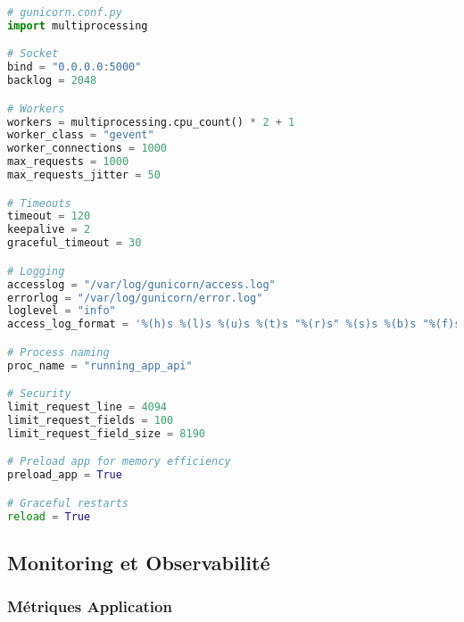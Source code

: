 \begin{lstlisting}[language=python]
# gunicorn.conf.py
import multiprocessing

# Socket
bind = "0.0.0.0:5000"
backlog = 2048

# Workers
workers = multiprocessing.cpu_count() * 2 + 1
worker_class = "gevent"
worker_connections = 1000
max_requests = 1000
max_requests_jitter = 50

# Timeouts
timeout = 120
keepalive = 2
graceful_timeout = 30

# Logging
accesslog = "/var/log/gunicorn/access.log"
errorlog = "/var/log/gunicorn/error.log"
loglevel = "info"
access_log_format = '%(h)s %(l)s %(u)s %(t)s "%(r)s" %(s)s %(b)s "%(f)s" "%(a)s" %(D)s'

# Process naming
proc_name = "running_app_api"

# Security
limit_request_line = 4094
limit_request_fields = 100
limit_request_field_size = 8190

# Preload app for memory efficiency
preload_app = True

# Graceful restarts
reload = True
\end{lstlisting}

\subsection{Monitoring et Observabilité}

\subsubsection{Métriques Application}

